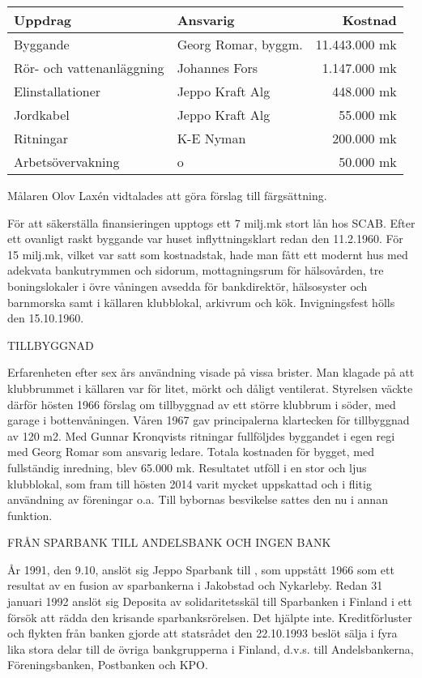 \begin{center}
  \begin{tabular}{l l r}
    \hline
    Uppdrag & Ansvarig & Kostnad \\ \hline
    Byggande & Georg Romar, byggm. & 11.443.000 mk \\
    Rör- och vattenanläggning & Johannes Fors & 1.147.000 mk \\
    Elinstallationer & Jeppo Kraft Alg & 448.000 mk \\
    Jordkabel & Jeppo Kraft Alg & 55.000 mk \\
    Ritningar & K-E Nyman & 200.000 mk \\
    Arbetsövervakning & o & 50.000 mk \\
    \hline
  \end{tabular}
\end{center}
Målaren Olov Laxén vidtalades att göra förslag till färgsättning.

För att säkerställa finansieringen upptogs ett 7 milj.mk stort lån hos SCAB. Efter ett ovanligt raskt byggande var huset inflyttningsklart redan den 11.2.1960. För 15 milj.mk, vilket var satt som kostnadstak, hade man fått ett modernt hus med adekvata bankutrymmen och sidorum, mottagningsrum för hälsovården, tre boningslokaler i övre våningen avsedda för bankdirektör, hälsosyster och barnmorska samt i källaren klubblokal, arkivrum och kök. Invigningsfest hölls den 15.10.1960.



TILLBYGGNAD

Erfarenheten efter sex års användning visade på vissa brister. Man klagade på att klubbrummet i källaren var för litet, mörkt och dåligt ventilerat. Styrelsen väckte därför hösten 1966 förslag om tillbyggnad av ett större klubbrum i söder, med garage i bottenvåningen. Våren 1967 gav principalerna klartecken för tillbyggnad av 120 m2. Med Gunnar Kronqvists ritningar fullföljdes byggandet i egen regi med Georg Romar som ansvarig ledare. Totala kostnaden för bygget, med fullständig inredning, blev 65.000 mk. Resultatet utföll i en stor och ljus klubblokal, som fram till hösten 2014 varit mycket uppskattad och i flitig användning av föreningar o.a. Till bybornas besvikelse sattes den nu i annan funktion.


FRÅN SPARBANK TILL ANDELSBANK OCH INGEN BANK

År 1991, den 9.10, anslöt sig Jeppo Sparbank till , som uppstått 1966 som ett resultat av en fusion av sparbankerna i Jakobstad och Nykarleby. Redan 31 januari 1992 anslöt sig Deposita av solidaritetsskäl till Sparbanken i Finland i ett försök att rädda den krisande sparbanksrörelsen. Det hjälpte inte. Kreditförluster och flykten från banken gjorde att statsrådet den 22.10.1993 beslöt sälja  i fyra lika stora delar till de övriga bankgrupperna i Finland, d.v.s. till Andelsbankerna, Föreningsbanken, Postbanken och KPO.

